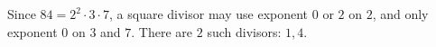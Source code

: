 Since $84=2^2\cdot3\cdot7$, a square divisor may use exponent $0$ or $2$ on $2$, and only exponent $0$ on $3$ and $7$. There are $\boxed2$ such divisors: $1,4$.
